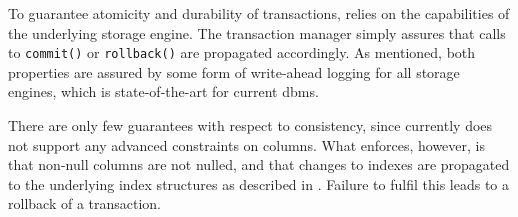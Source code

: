 To guarantee atomicity and durability of transactions, \cottontail{} relies on the capabilities of the underlying storage engine. The transaction manager simply assures that calls to \texttt{commit()} or \texttt{rollback()} are propagated accordingly. As mentioned, both properties are assured by some form of write-ahead logging for all storage engines, which is state-of-the-art for current \acrshort{dbms}.

There are only few guarantees with respect to consistency, since \cottontail{} currently does not support any advanced constraints on columns. What \cottontail{} enforces, however, is that non-null columns are not nulled, and that changes to indexes are propagated to the underlying index structures as described in . Failure to fulfil this leads to a rollback of a transaction.